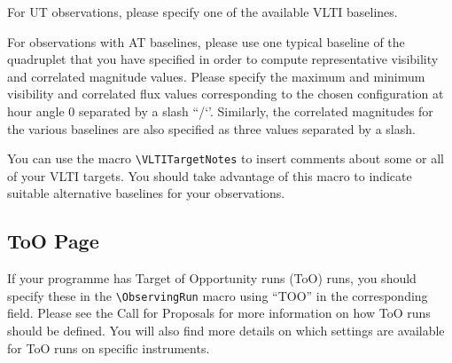\documentclass{article}
\begin{document}
For UT observations, please specify one of the available VLTI baselines.


For observations with AT baselines, please use one typical baseline of the
quadruplet that you have specified in order to compute
representative visibility and correlated magnitude values.
Please specify the maximum and minimum visibility and correlated flux values
corresponding to the chosen configuration at hour angle 0 separated by 
a slash ``/‘’. Similarly, the correlated magnitudes for the various baselines are also
specified as three values separated by a slash.

You can use the macro \verb|\VLTITargetNotes| to insert comments about
some or all of your VLTI targets. You should take advantage of this
macro to indicate suitable alternative baselines for your
observations.

\subsection{ToO Page}
\label{sec:toopage}

If your programme has Target of Opportunity runs (ToO) runs, 
you should specify these in the  \verb|\ObservingRun| macro 
using ``TOO'' in the corresponding field. 
Please see the Call for Proposals for more information on how ToO runs should be defined.
You will also find more details on which settings are available for ToO runs on specific instruments.
\end{document}
